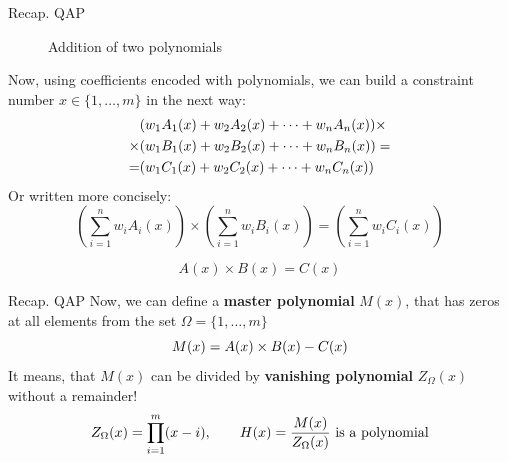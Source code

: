 \documentclass{zkdl-presentation-template}
\begin{document}
\begin{frame}{Recap. QAP}
\begin{figure}[H]
            \caption{Addition of two polynomials}
            \label{fig:example-polynomial-addition}
        \end{figure}
    \end{frame}

    \begin{frame}
        \vspace{-5pt}
        Now, using coefficients encoded with polynomials, we can build a constraint number 
        $x \in \{1, \dots, m\}$ in the next way:
        \vspace{-5pt}
        \begin{align*}
            &(w_1A_1(x) + w_2A_2(x) + \dots + w_nA_n(x)) \times \\
            \times &(w_1B_1(x) + w_2B_2(x) + \dots + w_nB_n(x)) = \\ 
            = &(w_1C_1(x) + w_2C_2(x) + \dots + w_nC_n(x))
            \vspace{-5pt}
        \end{align*}
        \pause
        Or written more concisely:
        \vspace{-5pt}
        \begin{equation*}
            \left( \sum_{i = 1}^{n} w_iA_i(x) \right) \times \left( \sum_{i = 1}^{n} w_iB_i(x) \right) = \left( \sum_{i = 1}^{n} w_iC_i(x) \right)
        \end{equation*}   
        
        \vspace{-5pt}
        \begin{equation*}
            A(x) \times B(x) = C(x)
        \end{equation*}   
    \end{frame}

    \begin{frame}{Recap. QAP}
        Now, we can define a \textbf{master polynomial} $M(x)$, that has zeros at all elements from the set
        $\Omega = \{1,\dots,m\}$
        \vspace{-5pt}
        \begin{equation*}
            M(x) = A(x) \times B(x) - C(x)
            \vspace{-5pt}
        \end{equation*}
        \pause
        It means, that $M(x)$ can be divided by \textbf{vanishing polynomial} $Z_{\Omega}(x)$ without a remainder!
        \vspace{-8pt}
        \begin{equation*}
            Z_{\Omega}(x) = \prod_{i=1}^m (x - i), \qquad \text{$H(x) = \frac{M(x)}{Z_{\Omega}(x)}$ is a polynomial}
            \vspace{-5pt}
        \end{equation*}
    \end{frame}
\end{document}
